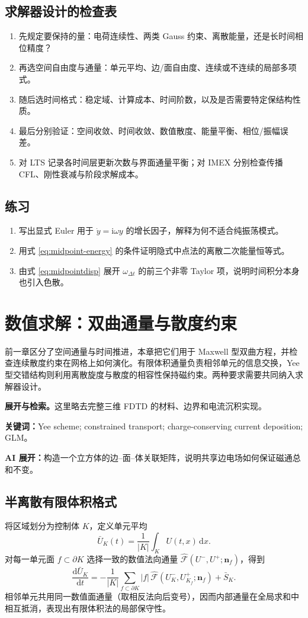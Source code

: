 \documentclass[UTF8,11pt,openany]{ctexbook}
\numberwithin{equation}{chapter}
\theoremstyle{definition}
\theoremstyle{remark}
\newcommand{\dd}{\mathrm d}
\newcommand{\studyroute}[3]{%
  \par\smallskip\noindent\textbf{展开与检索。}#1\par
  \noindent\textbf{关键词：}#2。\par
  \noindent\textbf{AI 展开：}#3\par
}
\begin{document}
\section{求解器设计的检查表}
\begin{enumerate}
\item 先规定要保持的量：电荷连续性、两类 Gauss 约束、离散能量，还是长时间相位精度？
\item 再选空间自由度与通量：单元平均、边/面自由度、连续或不连续的局部多项式。
\item 随后选时间格式：稳定域、计算成本、时间阶数，以及是否需要特定保结构性质。
\item 最后分别验证：空间收敛、时间收敛、数值散度、能量平衡、相位/振幅误差。
\item 对 LTS 记录各时间层更新次数与界面通量平衡；对 IMEX 分别检查传播 CFL、刚性衰减与阶段求解成本。
\end{enumerate}
\section{练习}
\begin{enumerate}
\item 写出显式 Euler 用于 $\dot y=\mathrm i\omega y$ 的增长因子，解释为何不适合纯振荡模式。
\item 用式 \eqref{eq:midpoint-energy} 的条件证明隐式中点法的离散二次能量恒等式。
\item 由式 \eqref{eq:midpointdisp} 展开 $\omega_{\Delta t}$ 的前三个非零 Taylor 项，说明时间积分本身也引入色散。
\end{enumerate}
\endgroup

\chapter{数值求解：双曲通量与散度约束}
\label{ch:numerics}
\begin{chaptersummary}
前一章区分了空间通量与时间推进，本章把它们用于 Maxwell 型双曲方程，并检查连续散度约束在网格上如何演化。有限体积通量负责相邻单元的信息交换，Yee 型交错结构则利用离散旋度与散度的相容性保持磁约束。两种要求需要共同纳入求解器设计。
\end{chaptersummary}
\studyroute{这里略去完整三维 FDTD 的材料、边界和电流沉积实现。}{Yee scheme; constrained transport; charge-conserving current deposition; GLM}{构造一个立方体的边--面--体关联矩阵，说明共享边电场如何保证磁通总和不变。}
\section{半离散有限体积格式}
将区域划分为控制体 $K$，定义单元平均
\begin{equation}
\bar U_K(t)=\frac1{|K|}\int_K U(t,x)\,\dd x.
\end{equation}
对每一单元面 $f\subset\partial K$ 选择一致的数值法向通量 $\widehat{\mathcal F}(U^-,U^+;\bm n_f)$，得到
\begin{equation}\label{eq:semidiscrete}
\frac{\dd\bar U_K}{\dd t}=
-\frac1{|K|}\sum_{f\subset\partial K}|f|\,
\widehat{\mathcal F}(U_K^-,U_{K_f}^+;\bm n_f)+\bar S_K.
\end{equation}
相邻单元共用同一数值面通量（取相反法向后变号），因而内部通量在全局求和中相互抵消，表现出有限体积法的局部保守性。
\end{document}

